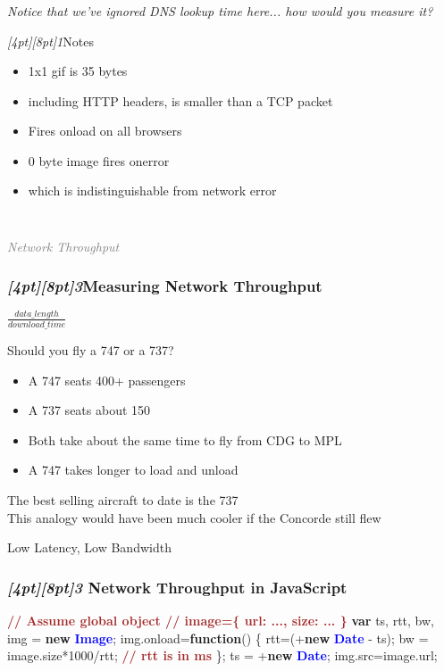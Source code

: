 \documentclass{beamer}
\newcommand{\sn}[1]{\textrm{\textit{\Huge{\raisebox{-3pt}[4pt][8pt]{\textcolor{f2elblue}{#1}}}}}\hspace{4pt}}
\newcommand{\innersplash}[1]{
  \begin{center}
    \large \textrm{\textit{ #1 } }
  \end{center}
}
\newcommand{\splashslide}[2][{}]{
  \begin{frame}
  \frametitle{#1}
  \innersplash{#2}
  \end{frame}
}
\newcommand{\leadinslide}[2]{
  \splashslide{
     {\fontsize{150}{20}\selectfont{\raisebox{0pt}[90pt][0pt]{\textcolor{light-gray}{#1}}}} \\ \huge \textcolor{gray}{#2}
  }
}
\def\brown<#1>#2{\textcolor<#1>{brown}{\textbf<#1>{#2}}}
\def\green<#1>#2{\textcolor<#1>{dark-green}{\textbf<#1>{#2}}}
\def\blue<#1>#2{\textcolor<#1>{blue}{\textbf<#1>{#2}}}
\begin{document}
\splashslide{Notice that we've ignored DNS lookup time here... how would you measure it?}

\begin{frame}{\sn{1}Notes}
\begin{itemize}
  \item 1x1 gif is 35 bytes
  \item including HTTP headers, is smaller than a TCP packet
  \item Fires onload on all browsers
  \item 0 byte image fires onerror
  \item which is indistinguishable from network error
\end{itemize}
\end{frame}

\leadinslide{3}{Network Throughput}

\splashslide[\sn{3}Measuring Network Throughput]{\LARGE{\( \frac{data\_length}{download\_time} \)}}

\begin{frame}{Should you fly a 747 or a 737?}
  \begin{itemize}
  \item A 747 seats 400+ passengers
  \item A 737 seats about 150
  \item Both take about the same time to fly from CDG to MPL
  \item A 747 takes longer to load and unload
  \end{itemize}
  \vfill
  \tiny{The best selling aircraft to date is the 737 \\ This analogy would have been much cooler if the Concorde still flew}
\end{frame}

\begin{frame}{Low Latency, Low Bandwidth}
\end{frame}


\begin{frame}[fragile]
\frametitle{\sn{3} Network Throughput in JavaScript}
\begin{semiverbatim}
\brown<1>{// Assume global object
// image=\{ url: ..., size: ... \}}
\green<1>{var} ts, rtt, bw, img = \green<1>{new} \blue<1>{Image};
img.onload=\green<1>{function}() \{
   rtt=(+\green<1>{new} \blue<1>{Date} - ts);
   bw = image.size*1000/rtt;    \brown<1>{// rtt is in ms}
\};
ts = +\green<1>{new} \blue<1>{Date};
img.src=image.url;
\end{semiverbatim}
\end{frame}
\end{document}
